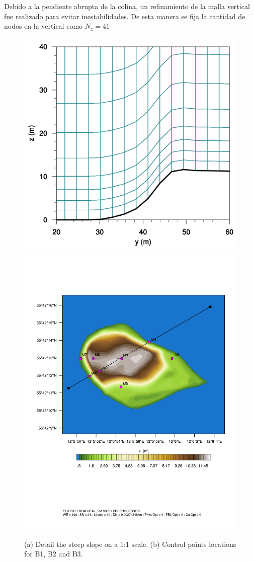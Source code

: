 Debido a la pendiente abrupta de la colina, un refinamiento de la malla vertical fue realizado para evitar inestabilidades. De esta manera se fija la cantidad de nodos en la vertical como $N_z=41$

\begin{figure}[H]
	\centering
	\includegraphics[width=0.38\linewidth,trim={0cm 0cm 0cm 0cm},clip]{Imagenes/05/hd_mesh_50}
	\includegraphics[width=0.44\linewidth,page=1,trim={3.4cm 9.3cm 1cm 4cm},clip]{Imagenes/05/bol_control_point.pdf}%
	
	\caption{(a) Detail the steep slope on a 1:1 scale. (b) Control points locations for B1, B2 and B3. }
	\label{fig:05_mesh_bol}
\end{figure}

\begin{table}[H]
	\caption{Characteristic values of each domain for B1, B2 and B3.}\label{tab:05_caract_bol}
	\centering\footnotesize{}
\end{table}

